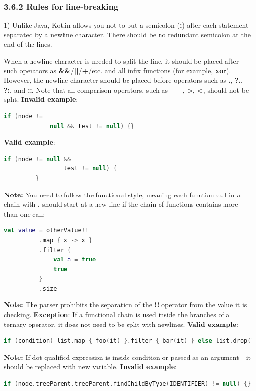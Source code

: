\subsubsection*{\textbf{3.6.2 Rules for line-breaking}}
\leavevmode\newline
\label{sec:3.6.2}
1) Unlike Java, Kotlin allows you not to put a semicolon (\textbf{;}) after each statement separated by a newline character.
    There should be no redundant semicolon at the end of the lines.
 
When a newline character is needed to split the line, it should be placed after such operators as \textbf{\&\&}/\textbf{||}/\textbf{+}/etc. and all infix functions (for example, \textbf{xor}).
However, the newline character should be placed before operators such as \textbf{.}, \textbf{?.}, \textbf{?:}, and \textbf{::}.
Note that all comparison operators, such as \textbf{==}, \textbf{>}, \textbf{<}, should not be split.
\textbf{Invalid example}: 
\begin{lstlisting}[language=Kotlin]
     if (node !=
             null && test != null) {}
\end{lstlisting}
 
\textbf{Valid example}: 
\begin{lstlisting}[language=Kotlin]
         if (node != null && 
                 test != null) {
         }
\end{lstlisting}
  
\textbf{Note:} You need to follow the functional style, meaning each function call in a chain with \textbf{.} should start at a new line if the chain of functions contains more than one call:
\begin{lstlisting}[language=Kotlin]
  val value = otherValue!!
          .map { x -> x }
          .filter {
              val a = true
              true
          }
          .size    
\end{lstlisting}
\textbf{Note:} The parser prohibits the separation of the \textbf{!!} operator from the value it is checking.
\textbf{Exception}: If a functional chain is used inside the branches of a ternary operator, it does not need to be split with newlines.
\textbf{Valid example}:  
\begin{lstlisting}[language=Kotlin]
if (condition) list.map { foo(it) }.filter { bar(it) } else list.drop(1)
\end{lstlisting}
\textbf{Note:} If dot qualified expression is inside condition or passed as an argument - it should be replaced with new variable.
\textbf{Invalid example}: 
\begin{lstlisting}[language=Kotlin]
 if (node.treeParent.treeParent.findChildByType(IDENTIFIER) != null) {}
\end{lstlisting}
 
